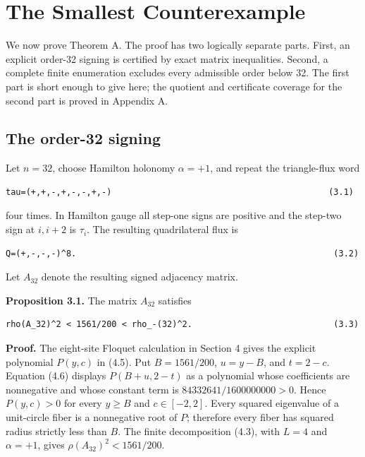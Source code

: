 \section{The Smallest Counterexample}

We now prove Theorem A. The proof has two logically separate parts. First, an
explicit order-32 signing is certified by exact matrix inequalities. Second, a
complete finite enumeration excludes every admissible order below 32. The
first part is short enough to give here; the quotient and certificate coverage
for the second part is proved in Appendix A.

\subsection{The order-32 signing}

Let \(n=32\), choose Hamilton holonomy \(\alpha=+1\), and repeat the triangle-flux
word

\begin{lstlisting}[language={}]
tau=(+,+,-,+,-,-,+,-)                                           (3.1)
\end{lstlisting}

four times. In Hamilton gauge all step-one signs are positive and the step-two
sign at \({i,i+2}\) is \(\tau_i\). The resulting quadrilateral flux is

\begin{lstlisting}[language={}]
Q=(+,-,-,-)^8.                                                   (3.2)
\end{lstlisting}

Let \(A_32\) denote the resulting signed adjacency matrix.

\textbf{Proposition 3.1.} The matrix \(A_32\) satisfies

\begin{lstlisting}[language={}]
rho(A_32)^2 < 1561/200 < rho_-(32)^2.                            (3.3)
\end{lstlisting}

\textbf{Proof.} The eight-site Floquet calculation in Section 4 gives the explicit
polynomial \(P(y,c)\) in (4.5). Put \(B=1561/200\), \(u=y-B\), and \(t=2-c\).
Equation (4.6) displays \(P(B+u,2-t)\) as a polynomial whose coefficients are
nonnegative and whose constant term is
\(84332641/1600000000>0\). Hence \(P(y,c)>0\) for every \(y\ge B\) and
\(c \in [-2,2]\). Every squared eigenvalue of a unit-circle fiber is a
nonnegative root of \(P\); therefore every fiber has squared radius strictly
less than \(B\). The finite decomposition (4.3), with \(L=4\) and \(\alpha=+1\),
gives \(\rho(A_32)^2<1561/200\).

